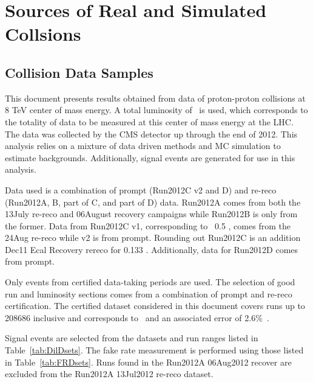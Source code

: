 \chapter{Sources of Real and Simulated Collsions}
\label{ch:samples}
\section{Collision Data Samples}
	
	This document presents results obtained from data of proton-proton collisions at 8 TeV center of mass energy. A total luminosity of \intLumi \ is used, which corresponds to the totality of data to be measured at this center of mass energy at the LHC. The data was collected by the CMS detector up through the end of 2012. This analysis relies on a mixture of data driven methods and MC simulation to estimate backgrounds. Additionally, signal events are generated for use in this analysis. 
	
	
	Data used is a combination of prompt (Run2012C v2 and D) and re-reco (Run2012A, B, part of C, and part of D) data.  
Run2012A comes from both the 13July re-reco and 06August recovery campaigns while Run2012B is only from the former.  
Data from Run2012C v1, corresponding to ~0.5 \fbinv, comes from the 24Aug re-reco while v2 is from prompt. Rounding out Run2012C is an addition Dec11 Ecal Recovery rereco for 0.133 \fbinv. Additionally, data for Run2012D comes from prompt.
    
Only events from certified data-taking periods are used.  
The selection of good run and luminosity sections comes from a combination of prompt and re-reco certification.  
The certified dataset considered in this document covers runs up to 208686 inclusive and corresponds to \intLumi \ and an associated error of 2.6\%~\cite{lumi12up}. 


	
	
	
Signal events are selected from the datasets and run ranges listed in Table~\ref{tab:DilDsets}.  The fake rate measurement is performed using those listed in Table~\ref{tab:FRDsets}.  Runs found in the Run2012A 06Aug2012 recover are excluded from the Run2012A 13Jul2012 re-reco dataset. 

